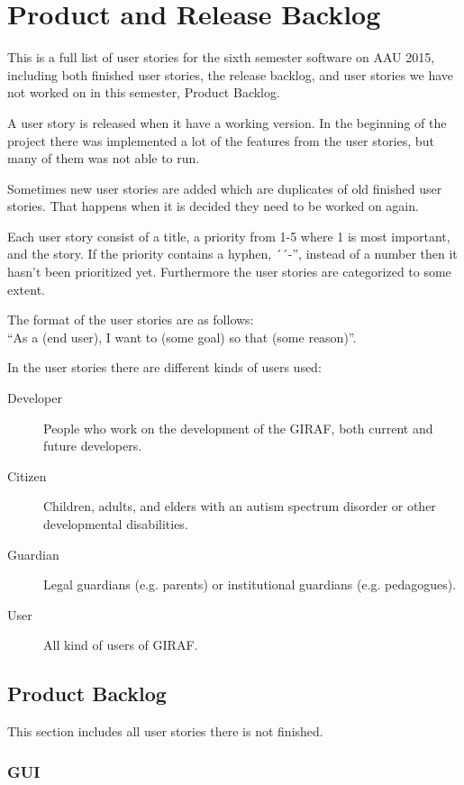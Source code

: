 



\chapter{Product and Release Backlog}
This is a full list of user stories for the sixth semester software on AAU 2015, including both finished user stories, the release backlog, and user stories we have not worked on in this semester, Product Backlog.

A user story is released when it have a working version. In the beginning of the project there was implemented a lot of the features from the user stories, but many of them was not able to run.

Sometimes new user stories are added which are duplicates of old finished user stories. That happens when it is decided they need to be worked on again.

Each user story consist of a title, a priority from 1-5 where 1 is most important, and the story. If the priority contains a hyphen, ´´-'', instead of a number then it hasn't been prioritized yet.
Furthermore the user stories are categorized to some extent.

The format of the user stories are as follows: \\
``As a (end user), I want to (some goal) so that (some reason)''.

In the user stories there are different kinds of users used:
\begin{description}
	\item [Developer] People who work on the development of the GIRAF, both current and future developers.
	\item [Citizen] Children, adults, and elders with an autism spectrum disorder or other developmental disabilities.
	\item [Guardian] Legal guardians (e.g. parents) or institutional guardians (e.g. pedagogues).
	\item [User] All kind of users of GIRAF.
\end{description}

\section{Product Backlog}
This section includes all user stories there is not finished.

\subsection{GUI}

